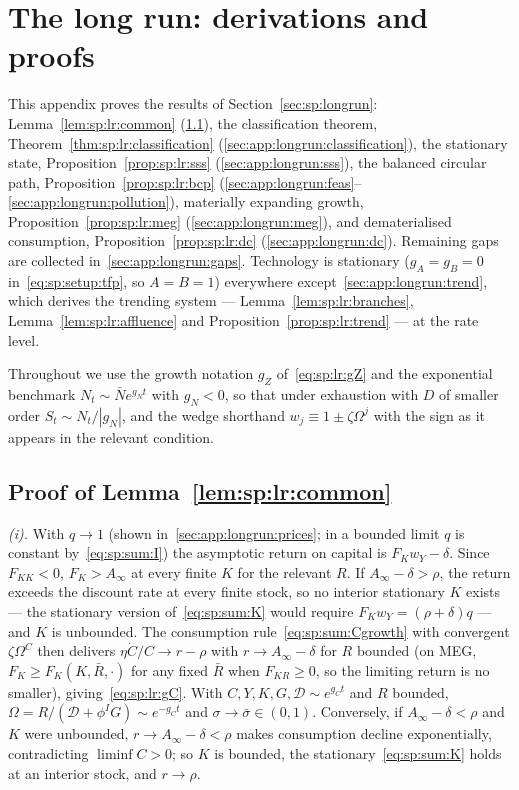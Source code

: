 \section{The long run: derivations and proofs}\label{sec:app:longrun}

This appendix proves the results of Section~\ref{sec:sp:longrun}: Lemma~\ref{lem:sp:lr:common}
(\ref{sec:app:longrun:common}), the classification theorem,
Theorem~\ref{thm:sp:lr:classification} (\ref{sec:app:longrun:classification}), the stationary
state, Proposition~\ref{prop:sp:lr:sss} (\ref{sec:app:longrun:sss}), the balanced circular
path, Proposition~\ref{prop:sp:lr:bcp}
(\ref{sec:app:longrun:feas}--\ref{sec:app:longrun:pollution}), materially expanding growth,
Proposition~\ref{prop:sp:lr:meg} (\ref{sec:app:longrun:meg}), and dematerialised consumption,
Proposition~\ref{prop:sp:lr:dc} (\ref{sec:app:longrun:dc}). Remaining gaps are collected
in~\ref{sec:app:longrun:gaps}. Technology is stationary ($g_A=g_B=0$
in~\eqref{eq:sp:setup:tfp}, so $A=B=1$) everywhere except~\ref{sec:app:longrun:trend}, which
derives the trending system --- Lemma~\ref{lem:sp:lr:branches},
Lemma~\ref{lem:sp:lr:affluence} and Proposition~\ref{prop:sp:lr:trend} --- at the rate
level.

Throughout we use the growth notation $g_Z$ of~\eqref{eq:sp:lr:gZ} and the exponential
benchmark $N_t\sim\bar Ne^{g_Nt}$ with $g_N<0$, so that under exhaustion with $D$ of smaller
order $S_t\sim N_t/\left|g_N\right|$, and the wedge shorthand $w_j\equiv1\pm\zeta\Omega^j$ with
the sign as it appears in the relevant condition.

\subsection{Proof of Lemma~\ref{lem:sp:lr:common}}\label{sec:app:longrun:common}

\emph{(i).} With $q\to1$ (shown in~\ref{sec:app:longrun:prices}; in a bounded limit $q$ is
constant by~\eqref{eq:sp:sum:I}) the asymptotic return on capital is $F_Kw_Y-\delta$. Since
$F_{KK}<0$, $F_K>A_\infty$ at every finite $K$ for the relevant $R$. If $A_\infty-\delta>\rho$,
the return exceeds the discount rate at every finite stock, so no interior stationary $K$
exists --- the stationary version of~\eqref{eq:sp:sum:K} would require
$F_Kw_Y=\left(\rho+\delta\right)q$ --- and $K$ is unbounded. The consumption
rule~\eqref{eq:sp:sum:Cgrowth} with convergent $\zeta\Omega^C$ then delivers
$\eta\dot C/C\to r-\rho$ with $r\to A_\infty-\delta$ for $R$ bounded (on MEG,
$F_K\ge F_K\left(K,\bar R,\cdot\right)$ for any fixed $\bar R$ when $F_{KR}\ge0$, so the
limiting return is no smaller), giving~\eqref{eq:sp:lr:gC}. With
$C,Y,K,G,\mathcal D\sim e^{g_Ct}$ and $R$ bounded,
$\Omega=R/\left(\mathcal D+\phi^IG\right)\sim e^{-g_Ct}$ and
$\sigma\to\bar\sigma\in\left(0,1\right)$. Conversely, if $A_\infty-\delta<\rho$ and $K$ were
unbounded, $r\to A_\infty-\delta<\rho$ makes consumption decline exponentially, contradicting
$\liminf C>0$; so $K$ is bounded, the stationary~\eqref{eq:sp:sum:K} holds at an interior
stock, and $r\to\rho$.

